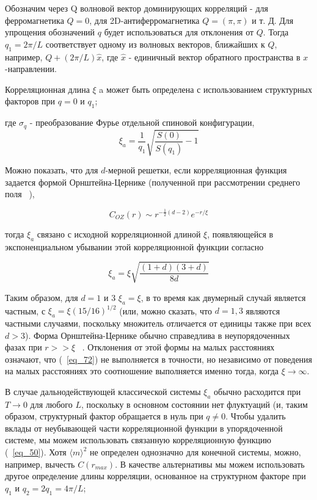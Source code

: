 \documentclass[11pt]{article}
\begin{document}
Обозначим через Q волновой вектор доминирующих корреляций - для ферромагнетика $Q = 0$, для 2D-антиферромагнетика $Q = (\pi, \pi)$ и т. Д. Для упрощения обозначений $q$ будет использоваться для отклонения от $Q$. Тогда $q_1 = 2\pi / L$ соответствует одному из волновых векторов, ближайших к $Q$, например, $Q + (2 \pi / L) \hat{x}$, где $\hat{x}$ - единичный вектор обратного пространства в $x$-направлении.

Корреляционная длина $\xi$ a может быть определена с использованием структурных факторов при $q = 0$ и $q_1$;

где $\sigma_q$ - преобразование Фурье отдельной спиновой конфигурации,
\begin{equation}
\xi_a=\frac{1}{q_1}\sqrt{\frac{S(0)}{S(q_1)}-1}
\label{eq_70}
\end{equation}

Можно показать, что для $d$-мерной решетки, если корреляционная функция задается формой Орнштейна-Цернике (полученной при рассмотрении среднего поля ~\cite{cardy}),

\begin{equation}
C_{OZ}(r) \sim r^{-\frac{1}{2}(d-2)}e^{-r/\xi}
\label{eq_71}
\end{equation}

тогда $\xi_a$ связано с исходной корреляционной длиной $\xi$, появляющейся в экспоненциальном убывании этой корреляционной функции согласно

\begin{equation}
\xi_a=\xi \sqrt{\frac{(1+d)(3+d)}{8d}}
\label{eq_72}
\end{equation}

Таким образом, для $d = 1$ и 3 $\xi_a = \xi$, в то время как двумерный случай является частным, с $\xi_a = \xi(15/16)^{1/2}$ (или, можно сказать, что $d = 1,3$ являются частными случаями, поскольку множитель отличается от единицы также при всех $d> 3$). Форма Орнштейна-Цернике обычно справедлива в неупорядоченных 
фазах при $r>>\xi$ ~\cite{cardy}. Отклонения от этой формы на малых расстояниях означают, что (~\ref{eq_72}) не выполняется в точности, но независимо от поведения на малых расстояниях это соотношение выполняется именно тогда, когда $\xi → ∞ $.

В случае дальнодействующей классической системы $\xi_a$ обычно расходится при $T → 0$ для любого $L$, поскольку в основном состоянии нет флуктуаций (и, таким образом, структурный фактор обращается в нуль при $q \ne 0$. Чтобы удалить вклады от неубывающей части корреляционной функции в упорядоченной системе, мы можем использовать связанную корреляционную функцию (~\ref{eq_50}). Хотя $\langle m \rangle ^2$ не определен однозначно для конечной системы, можно, например, вычесть $C(r_{max})$. В качестве альтернативы мы можем использовать другое определение длины корреляции, основанное на структурном факторе при $q_1$ и $q_2 = 2q_1 = 4 \pi / L$;
\end{document}
